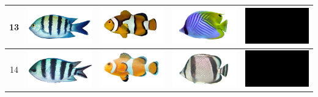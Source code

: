 \begin{longtable}{|c|c|c|c|c|}
    13 & \includegraphics[width=3cm]{gambar/abudefduf/A13} & \includegraphics[width=3cm]{gambar/amphiprion/A13} & \includegraphics[width=3cm]{gambar/chaetodon/C13} & \includegraphics[width=3cm]{gambar/negative_examples/N13} \\
    \hline
    14 & \includegraphics[width=3cm]{gambar/abudefduf/A14} & \includegraphics[width=3cm]{gambar/amphiprion/A14} & \includegraphics[width=3cm]{gambar/chaetodon/C14} & \includegraphics[width=3cm]{gambar/negative_examples/N14} \\
    \hline

\end{longtable}
